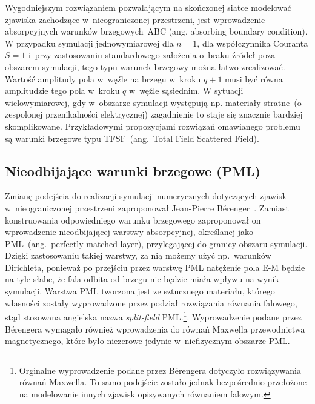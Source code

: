 Wygodniejszym rozwiązaniem pozwalającym na skończonej siatce modelować zjawiska zachodzące w~nieograniczonej przestrzeni, jest wprowadzenie absorpcyjnych warunków brzegowych~ABC (ang. absorbing boundary condition). W przypadku symulacji jednowymiarowej dla $n=1$, dla współczynnika Couranta $S=1$ i~przy zastosowaniu standardowego założenia o~braku źródeł poza obszarem symulacji, tego typu warunek brzegowy można łatwo zrealizować. Wartość amplitudy pola w~węźle na brzegu w~kroku $q+1$ musi być równa amplitudzie tego pola w~kroku $q$ w~węźle sąsiednim. W sytuacji wielowymiarowej, gdy w~obszarze symulacji występują np. materiały stratne~(o zespolonej przenikalności elektrycznej) zagadnienie to staje się znacznie bardziej skomplikowane. Przykładowymi propozycjami rozwiązań omawianego problemu są warunki brzegowe typu TFSF~(ang.~Total Field Scattered Field).

\subsection{Nieodbijające warunki brzegowe (PML)}
\label{art:pml}
Zmianę podejścia do realizacji symulacji numerycznych dotyczących zjawisk w~nieograniczonej przestrzeni zaproponował Jean-Pierre B\'{e}renger~\cite{1994JCoPh.114..185B}. Zamiast konstruowania odpowiedniego warunku brzegowego zaproponował on wprowadzenie nieodbijającej warstwy absorpcyjnej, określanej jako PML~(ang.~perfectly matched layer), przylegającej do granicy obszaru symulacji. Dzięki zastosowaniu takiej warstwy, za nią możemy użyć np.~warunków Dirichleta, ponieważ po przejściu przez warstwę PML natężenie pola E-M będzie na tyle słabe, że fala odbita od brzegu nie będzie miała wpływu na wynik symulacji. Warstwa PML tworzona jest ze sztucznego materiału, którego własności zostały wyprowadzone przez podział rozwiązania równania falowego,  stąd stosowana angielska nazwa {\it split-field} PML.\footnote{Orginalne wyprowadzenie podane przez B\'{e}rengera dotyczyło rozwiązywania równań Maxwella. To samo podejście zostało jednak bezpośrednio przełożone na modelowanie innych zjawisk opisywanych równaniem falowym.}.  Wyprowadzenie podane przez B\'{e}rengera  wymagało również wprowadzenia do równań Maxwella przewodnictwa magnetycznego, które było niezerowe jedynie w~niefizycznym obszarze PML.


